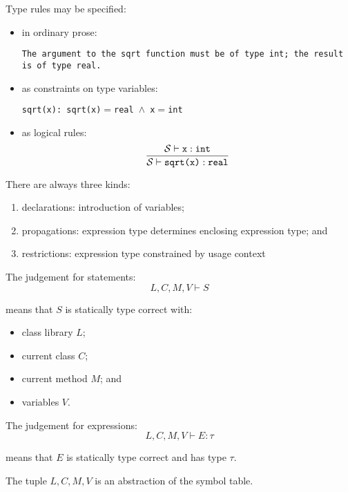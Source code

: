 \begin{slide*}
Type rules may be specified:

\begin{itemize}
\item in ordinary prose:\\
\begin{small}
{\tt The argument to the sqrt function must be of type int; the result is of type real.}
\end{small}
\item as constraints on type variables:
\begin{center}
{\tt sqrt(x): \LL{}sqrt(x)\RR{}$=$real $\wedge$ \LL{}x\RR{}$=$int}
\end{center}
\item as logical rules:
$$ \frac{{\cal S} \vdash \mbox{\tt x}: \mbox{\tt int}}{{\cal S} \vdash \mbox{\tt sqrt(x)}: \mbox{\tt real}}$$
\end{itemize}

There are always three kinds:
\begin{enumerate}
\item declarations: introduction of variables;
\item propagations: expression type determines enclosing expression
type; and
\item restrictions: expression type constrained by usage context
\end{enumerate}
\vfil
\end{slide*}

\newcommand{\lib}{\mbox{$L$}}
\newcommand{\class}{\mbox{$C$}}
\newcommand{\method}{\mbox{$M$}}
\newcommand{\vars}{\mbox{$V$}}
 
\begin{slide*}
The judgement for statements:
$$ \lib{},\class{},\method{},\vars{} \vdash S $$

means that $S$ is statically type correct with:

\begin{itemize}
\item class library \lib{};
\item current class \class{};
\item current method \method{}; and
\item variables \vars{}.
\end{itemize}

The judgement for expressions:
$$ \lib{},\class{},\method{},\vars{} \vdash E: \tau $$
 
means that $E$ is statically type correct and has type $\tau$.

The tuple $\lib{},\class{},\method{},\vars{}$ is an abstraction of the symbol table.
\vfil
\end{slide*}
 
